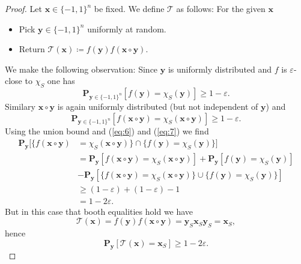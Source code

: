 \documentclass[a4paper]{article}
\newcommand{\prob}{\mathbf{P}}
\newcommand{\eps}{\varepsilon}
\newcommand{\boldx}{\boldsymbol{x}}
\newcommand{\boldy}{\boldsymbol{y}}
\theoremstyle{plain}
\theoremstyle{definition}
\theoremstyle{remark}
\begin{document}
\begin{proof}
  Let \(\boldx\in \{-1,1\}^n\) be fixed. We define \(\mathcal{T}\) as
  follows: For the given \(\boldx\)
  \begin{itemize}
  \item Pick \(\boldy\in\{-1,1\}^n\) uniformly at random.
  \item Return \(\mathcal{T}(\boldx) \coloneqq f(\boldy)f(\boldx\circ \boldy)\). 
  \end{itemize}
  We make the following observation: Since \(\boldy\) is uniformly
  distributed and \(f\) is \(\eps\)-close to \(\chi_S\) one has
  \begin{equation}
    \label{eq:6}
    \prob_{\boldy\in\{-1,1\}^n}[f(\boldy) = \chi_S(\boldy)] \geq 1 - \eps. 
  \end{equation}
  Similary \(\boldx\circ \boldy\) is again uniformly distributed (but not
  independent of \(\boldy\)) and 
  \begin{equation}
    \label{eq:7}
    \prob_{\boldy\in\{-1,1\}^n}[f(\boldx\circ \boldy) = \chi_S(\boldx\circ \boldy)] \geq 1 - \eps. 
  \end{equation}
  Using the union bound and (\ref{eq:6}) and (\ref{eq:7}) we find 
  \begin{align}
    \label{eq:8}
    \prob_{\boldy}[\{f(\boldx\circ \boldy) &= \chi_S(\boldx\circ \boldy)\} \cap \{f(\boldy) = \chi_S(\boldy)\}] \\
    &= \prob_{\boldy}[f(\boldx\circ \boldy) = \chi_S(\boldx\circ \boldy)] + \prob_{\boldy}[f(\boldy) = \chi_S(\boldy)] \\ 
    &- \prob_{\boldy}[\{f(\boldx\circ \boldy) = \chi_S(\boldx\circ \boldy)\} \cup \{f(\boldy) = \chi_S(\boldy)\}] \\
    &\geq (1-\eps) + (1-\eps) - 1 \\
    &= 1-2\eps. 
  \end{align}
  But in this case that booth equalities hold we have 
  \[\mathcal{T}(\boldx) = f(\boldy)f(\boldx\circ \boldy) = \boldy_S\boldx_S\boldy_S = \boldx_S,\] 
  hence 
  \[\prob_{\boldy}[\mathcal{T}(\boldx) = \boldx_S] \geq 1 - 2\eps.\]
  \end{proof}
\end{document}
